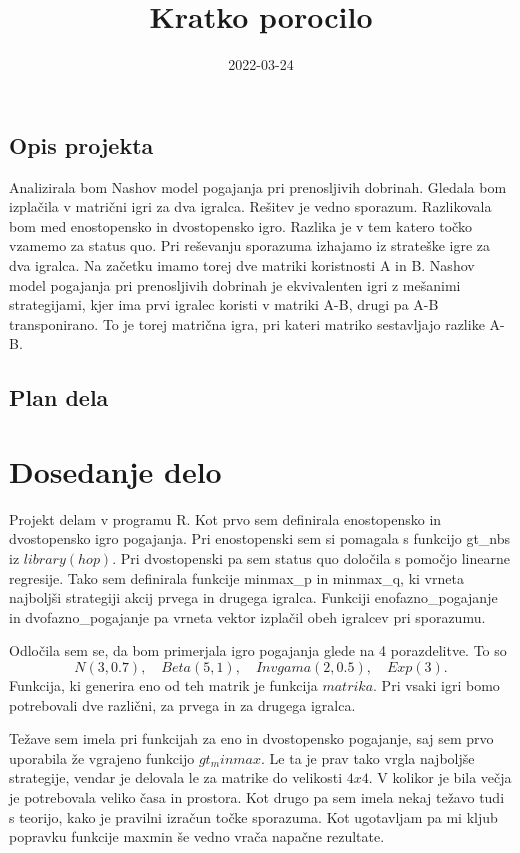\documentclass[
]{article}
\title{Kratko porocilo}
\author{}
\date{\vspace{-2.5em}2022-03-24}
\begin{document}
\maketitle

\hypertarget{opis-projekta}{%
\subsection{Opis projekta}\label{opis-projekta}}

Analizirala bom Nashov model pogajanja pri prenosljivih dobrinah.
Gledala bom izplačila v matrični igri za dva igralca. Rešitev je vedno
sporazum. Razlikovala bom med enostopensko in dvostopensko igro. Razlika
je v tem katero točko vzamemo za status quo. Pri reševanju sporazuma
izhajamo iz strateške igre za dva igralca. Na začetku imamo torej dve
matriki koristnosti A in B. Nashov model pogajanja pri prenosljivih
dobrinah je ekvivalenten igri z mešanimi strategijami, kjer ima prvi
igralec koristi v matriki A-B, drugi pa A-B transponirano. To je torej
matrična igra, pri kateri matriko sestavljajo razlike A-B.

\hypertarget{plan-dela}{%
\subsection{Plan dela}\label{plan-dela}}

\hypertarget{dosedanje-delo}{%
\section{Dosedanje delo}\label{dosedanje-delo}}

Projekt delam v programu R. Kot prvo sem definirala enostopensko in
dvostopensko igro pogajanja. Pri enostopenski sem si pomagala s funkcijo
gt\_nbs iz \(library(hop)\). Pri dvostopenski pa sem status quo določila
s pomočjo linearne regresije. Tako sem definirala funkcije minmax\_p in
minmax\_q, ki vrneta najboljši strategiji akcij prvega in drugega
igralca. Funkciji enofazno\_pogajanje in dvofazno\_pogajanje pa vrneta
vektor izplačil obeh igralcev pri sporazumu.

Odločila sem se, da bom primerjala igro pogajanja glede na 4
porazdelitve. To so
\[N(3, 0.7), \quad Beta(5,1), \quad Invgama(2, 0.5), \quad Exp(3).\]
Funkcija, ki generira eno od teh matrik je funkcija \(matrika.\) Pri
vsaki igri bomo potrebovali dve različni, za prvega in za drugega
igralca.

Težave sem imela pri funkcijah za eno in dvostopensko pogajanje, saj sem
prvo uporabila že vgrajeno funkcijo \(gt_minmax\). Le ta je prav tako
vrgla najboljše strategije, vendar je delovala le za matrike do
velikosti \(4 x 4\). V kolikor je bila večja je potrebovala veliko časa
in prostora. Kot drugo pa sem imela nekaj težavo tudi s teorijo, kako je
pravilni izračun točke sporazuma. Kot ugotavljam pa mi kljub popravku
funkcije maxmin še vedno vrača napačne rezultate.
\end{document}
